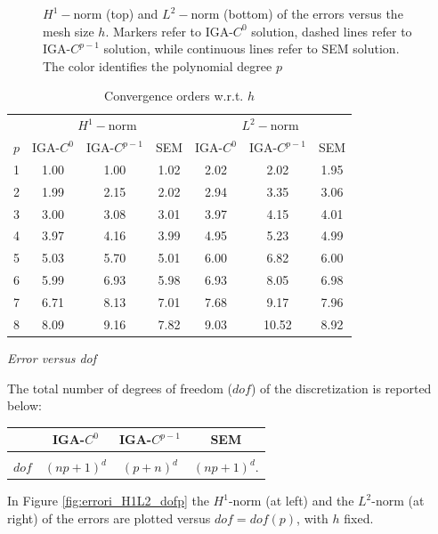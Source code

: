 \documentclass[11pt]{article}
\begin{document}
\begin{figure}
\caption{$H^1-$norm   (top) and $L^2-$norm (bottom) of the errors 
versus the mesh size $h$.
Markers refer to IGA-$C^0$ solution, dashed lines refer to IGA-$C^{p-1}$
solution, while continuous lines refer to SEM solution. The color identifies the
polynomial degree $p$}
\label{fig:errori_H1L2_h}
\end{figure}


\begin{table}
\caption{Convergence orders w.r.t. $h$}\label{tab:ordini_h}
\begin{center}
\begin{tabular}{c|ccc|ccc}
& \multicolumn{3}{c|}{$H^1-$norm}&\multicolumn{3}{c}{$L^2-$norm}\\
$p$ & IGA-$C^0$ & IGA-$C^{p-1}$ & SEM& IGA-$C^0$ & IGA-$C^{p-1}$ & SEM\\
\hline
1 & 1.00 & 1.00 & 1.02 & 2.02 & 2.02 & 1.95 \\
2 & 1.99 & 2.15 & 2.02 & 2.94 & 3.35 & 3.06 \\ 
3 & 3.00 & 3.08 & 3.01 & 3.97 & 4.15 & 4.01 \\
4 & 3.97 & 4.16 & 3.99 & 4.95 & 5.23 & 4.99\\
5 & 5.03 & 5.70 & 5.01 & 6.00 & 6.82 & 6.00\\
6 & 5.99 & 6.93 & 5.98 & 6.93 & 8.05 & 6.98 \\
7 & 6.71 & 8.13 & 7.01 & 7.68 & 9.17 & 7.96\\
8 & 8.09 & 9.16 & 7.82 & 9.03 &10.52 & 8.92 \\
\end{tabular}
\end{center}
\end{table}



\null
\emph{Error versus dof}

The total
number of degrees of freedom ($dof$) of the discretization
is reported below:

\begin{center}
\begin{tabular}{r|ccc}
 & IGA-$C^0$ & IGA-$C^{p-1}$ & SEM\\
\hline\\[-2mm]
$dof $ & $(np+1)^d$ & $(p+n)^d$ & $(np+1)^d$.
\end{tabular}
\end{center}

In Figure \ref{fig:errori_H1L2_dofp} the $H^1$-norm (at left) and the
$L^2$-norm (at right) of the errors are plotted 
versus $dof=dof(p)$, with $h$ fixed.
\end{document}

